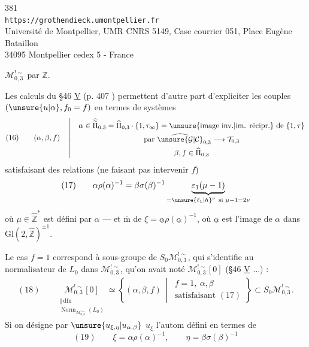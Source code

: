 \begin{center}
381\\
\texttt{https://grothendieck.umontpellier.fr}\\
Université de Montpellier, UMR CNRS 5149, Case courrier 051, Place Eugène Bataillon\\
34095 Montpellier cedex 5 - France
\end{center}

$\mathcal M_{0,3}^{!\sim}$ par $\widehat{\mathbb Z}$.

Les calculs du \S 46 \uline{V} (p. 407 ) permettent d'autre part d'expliciter les couples $(\unsure{u|\alpha},f_0=f)$ en termes de systèmes
\[
(16)\qquad
(\alpha,\beta,f)\quad\left|\quad
\begin{gathered}
\alpha\in\widehat{\widetilde{\Pi}}_{0,3}
 =\widehat{\Pi}_{0,3}\cdot\{1,\tau_\infty\}
 =\text{\unsure{image inv.|im. récipr.} de }\{1,\tau\}\\
\text{par }\widehat{\unsure{\mathcal G|\mathcal C}}_{0,3}\longrightarrow\mathcal T_{0,3}\\
\beta,f\in\widehat{\Pi}_{0,3}
\end{gathered}\right.
\]
satisfaisant des relations (ne faisant pas intervenir $f$)
\[
(17)\qquad
\alpha\rho(\alpha)^{-1}
 =\beta\sigma(\beta)^{-1}
 \underbrace{\varepsilon_1(\mu-1)}_{=\unsure{\ell_1|h}^{\nu}\ \text{si }\mu-1=2\nu}
\]
où $\mu\in\widehat{\mathbb Z}^{*}$ est défini   par $\alpha$ --- et $\overline{\mathrm m}$   de $\xi=\underline\alpha\rho(\underline\alpha)^{-1}$, où $\underline\alpha$ est l'image de $\alpha$ dans $\mathrm{Gl}(2,\widehat{\mathbb Z})^{\pm1}$.

Le cas $f=1$ correspond à  sous-groupe de $S_0\mathcal M_{0,3}^{!\sim}$, qui s'identifie au normalisateur de $L_0$ dans $\mathcal M_{0,3}^{!\sim}$, qu'on avait noté $\mathcal M_{0,3}^{!\sim}[0]$ (\S 46 \uline{V} $\ldots$) :
\[
\begin{gathered}
(18)\qquad
\underset{\substack{\Vert\ \mathrm{dfn}\\
\operatorname{Norm}_{\mathcal M_{0,3}^{!\sim}}(L_0)}}{\mathcal M_{0,3}^{!\sim}[0]}
\simeq
\left\{(\alpha,\beta,f)\,\middle|\,
\begin{array}{l}f=1,\ \alpha,\beta\\\text{satisfaisant }(17)\end{array}\right\}
\subset S_0\mathcal M_{0,3}^{!\sim} .
\end{gathered}
\]
Si on désigne par $\unsure{u_{\xi,\eta}|u_{\alpha,\beta}}$    $u_\xi$ l'autom défini en termes de
\[
(19)\qquad
\xi=\alpha\rho(\alpha)^{-1},\qquad
\eta=\beta\sigma(\beta)^{-1}
\]

